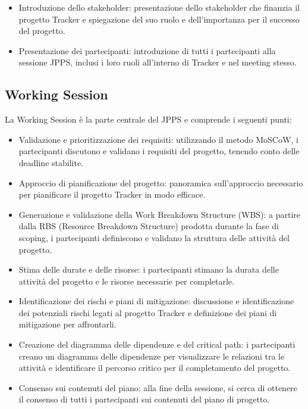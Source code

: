 \documentclass[oneside]{book}
\begin{document}
\begin{itemize}
    \item Introduzione dello stakeholder: presentazione dello stakeholder che finanzia il progetto Tracker e spiegazione del suo ruolo e dell'importanza per il successo del progetto.
    \item Presentazione dei partecipanti: introduzione di tutti i partecipanti alla sessione JPPS, inclusi i loro ruoli all'interno di Tracker e nel meeting stesso.
\end{itemize}

\subsection{Working Session}
La Working Session è la parte centrale del JPPS e comprende i seguenti punti:

\begin{itemize}
    \item Validazione e prioritizzazione dei requisiti: utilizzando il metodo MoSCoW, i partecipanti discutono e validano i requisiti del progetto, tenendo conto delle deadline stabilite.
    \item Approccio di pianificazione del progetto: panoramica sull'approccio necessario per pianificare il progetto Tracker in modo efficace.
    \item Generazione e validazione della Work Breakdown Structure (WBS): a partire dalla RBS (Resource Breakdown Structure) prodotta durante la fase di scoping, i partecipanti definiscono e validano la struttura delle attività del progetto.
    \item Stima delle durate e delle risorse: i partecipanti stimano la durata delle attività del progetto e le risorse necessarie per completarle.
    \item Identificazione dei rischi e piani di mitigazione: discussione e identificazione dei potenziali rischi legati al progetto Tracker e definizione dei piani di mitigazione per affrontarli.
    \item Creazione del diagramma delle dipendenze e del critical path: i partecipanti creano un diagramma delle dipendenze per visualizzare le relazioni tra le attività e identificare il percorso critico per il completamento del progetto.
    \item Consenso sui contenuti del piano: alla fine della sessione, si cerca di ottenere il consenso di tutti i partecipanti sui contenuti del piano di progetto.
\end{itemize}
\end{document}
